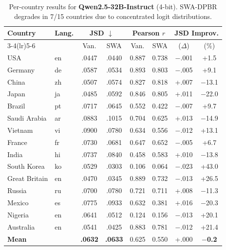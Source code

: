 \documentclass{article}
\newcommand{\gain}[1]{\textcolor{improvegreen}{#1}}
\newcommand{\loss}[1]{\textcolor{worsered}{#1}}
\begin{document}
\begin{table}[h]
\caption{Per-country results for \textbf{Qwen2.5-32B-Instruct} (4-bit).
SWA-DPBR degrades in 7/15 countries due to concentrated logit distributions.}
\label{tab:qwen32b_percountry}
\centering\setlength{\tabcolsep}{3.5pt}\footnotesize
\begin{tabular}{llcccccc}
\toprule
Country & Lang. & \multicolumn{2}{c}{JSD $\downarrow$} & \multicolumn{2}{c}{Pearson $r$} & \multicolumn{2}{c}{JSD Improv.} \\
\cmidrule(lr){3-4}\cmidrule(lr){5-6}
 & & Van. & SWA & Van. & SWA & ($\Delta$) & (\%) \\
\midrule
USA         & en & .0447 & .0440 & 0.887 & 0.738 & $-$.001 & \gain{+1.5} \\
Germany     & de & .0587 & .0534 & 0.893 & 0.803 & $-$.005 & \gain{+9.1} \\
China       & zh & .0507 & .0574 & 0.827 & 0.818 & +.007 & \loss{$-$13.1} \\
Japan       & ja & .0485 & .0592 & 0.846 & 0.805 & +.011 & \loss{$-$22.0} \\
Brazil      & pt & .0717 & .0645 & 0.552 & 0.422 & $-$.007 & \gain{+9.7} \\
Saudi Arabia& ar & .0883 & .1015 & 0.704 & 0.625 & +.013 & \loss{$-$14.9} \\
Vietnam     & vi & .0900 & .0780 & 0.634 & 0.556 & $-$.012 & \gain{+13.1} \\
France      & fr & .0730 & .0681 & 0.647 & 0.652 & $-$.005 & \gain{+6.7} \\
India       & hi & .0737 & .0840 & 0.458 & 0.583 & +.010 & \loss{$-$13.8} \\
South Korea & ko & .0529 & .0303 & 0.106 & 0.064 & $-$.023 & \gain{+43.0} \\
Great Britain& en& .0470 & .0345 & 0.889 & 0.732 & $-$.013 & \gain{+26.5} \\
Russia      & ru & .0700 & .0780 & 0.721 & 0.711 & +.008 & \loss{$-$11.3} \\
Mexico      & es & .0775 & .0933 & 0.632 & 0.381 & +.016 & \loss{$-$20.3} \\
Nigeria     & en & .0641 & .0512 & 0.124 & 0.156 & $-$.013 & \gain{+20.1} \\
Australia   & en & .0541 & .0425 & 0.883 & 0.781 & $-$.012 & \gain{+21.4} \\
\midrule
\textbf{Mean} & & \textbf{.0632} & \textbf{.0633} & 0.625 & 0.550 & +.000 & \loss{\textbf{$-$0.2}} \\
\bottomrule
\end{tabular}
\end{table}
\end{document}

